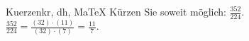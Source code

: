 \begin{MAufgabe}{Kuerzen}{kr, dh, MaTeX}
K\"urzen Sie soweit m\"oglich: $\frac{352}{224}$.\\ 
\ifLsg\MLoesung
\quad $\frac{352}{224}=\frac{(32)\cdot(11)}{(32)\cdot(7)}=\frac{11}{7}$.\else\relax\fi
 \end{MAufgabe}